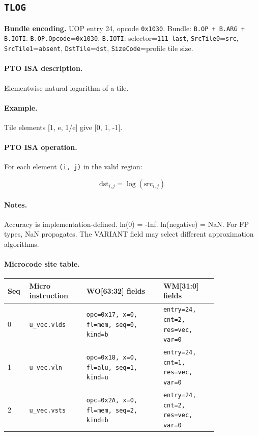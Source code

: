 \subsection{\texttt{TLOG}}
\noindent\textbf{Bundle encoding.} UOP entry 24, opcode \texttt{0x1030}. Bundle: \texttt{B.OP + B.ARG + B.IOTI}. \texttt{B.OP.Opcode}=\texttt{0x1030}. \texttt{B.IOTI}: selector=\texttt{111 last}, \texttt{SrcTile0}=\texttt{src}, \texttt{SrcTile1}=\texttt{absent}, \texttt{DstTile}=\texttt{dst}, \texttt{SizeCode}=profile tile size.\par\smallskip
{\small
\paragraph{PTO ISA description.}
Elementwise natural logarithm of a tile.
\paragraph{Example.}
Tile elements [1, e, 1/e] give [0, 1, -1].
\par\smallskip
\paragraph{PTO ISA operation.}
For each element \texttt{(i, j)} in the valid region:

\[
\mathrm{dst}_{i,j} = \log(\mathrm{src}_{i,j})
\]
}\par\smallskip
\paragraph{Notes.}
Accuracy is implementation-defined. ln(0) = -Inf. ln(negative) = NaN. For FP types, NaN propagates. The VARIANT field may select different approximation algorithms.
\paragraph{Microcode site table.}
{\scriptsize
\begin{longtable}{@{}R{0.055\linewidth}L{0.23\linewidth}L{0.31\linewidth}L{0.22\linewidth}@{}}
\toprule
Seq & Micro instruction & WO[63:32] fields & WM[31:0] fields \\
 & \texttt{u\_vec.vlds} & \texttt{opc=0x17, x=0, fl=mem, seq=0, kind=b} & \texttt{entry=24, cnt=2, res=vec, var=0} \\
1 & \texttt{u\_vec.vln} & \texttt{opc=0x18, x=0, fl=alu, seq=1, kind=u} & \texttt{entry=24, cnt=1, res=vec, var=0} \\
2 & \texttt{u\_vec.vsts} & \texttt{opc=0x2A, x=0, fl=mem, seq=2, kind=b} & \texttt{entry=24, cnt=2, res=vec, var=0} \\
\bottomrule
\end{longtable}
}

